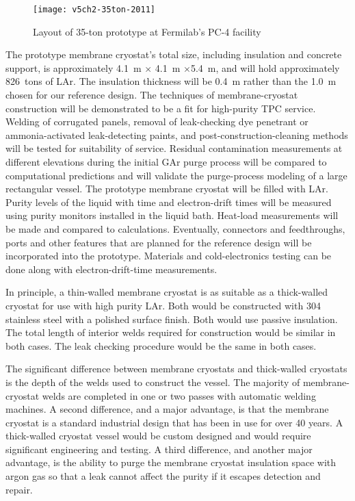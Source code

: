 \begin{figure}[htbp]
\centering
\texttt{[image: v5ch2-35ton-2011]} 
\caption{Layout of 35-ton prototype at Fermilab's PC-4 facility}
\label{fig:v5ch2-35ton-2011}
\end{figure}

The prototype membrane cryostat's total size, including insulation and concrete support, is approximately 4.1~m $\times$ 4.1~m $\times$5.4~m, and will hold approximately 826~tons of LAr. The insulation thickness will be 0.4~m rather than the 1.0~m chosen for our reference design.  The techniques of membrane-cryostat construction will be demonstrated to be a fit for high-purity TPC service.  Welding of corrugated panels, removal of leak-checking dye penetrant or ammonia-activated leak-detecting paints, and post-construction-cleaning methods will be tested for suitability of service.  Residual contamination measurements at different elevations during the initial GAr purge process will be compared to computational predictions and will validate the purge-process modeling of a large rectangular vessel.  The prototype membrane cryostat will be filled with LAr.  Purity levels of the liquid with time and electron-drift times will be measured using purity monitors installed in the liquid bath.  Heat-load measurements will be made and compared to calculations. Eventually, connectors and feedthroughs, ports and other features that are planned for the reference design will be incorporated into the prototype.  Materials and cold-electronics testing can be done along with electron-drift-time measurements.

In principle, a thin-walled membrane cryostat is as suitable as a thick-walled cryostat for use with high purity LAr. Both would be constructed with 304 stainless steel with a polished surface finish. Both would use passive insulation. The total length of interior welds required for construction would be similar in both cases. The leak checking procedure would be the same in both cases.

The significant difference between membrane cryostats and thick-walled cryostats is the depth of the welds used to construct the vessel.  The majority of membrane-cryostat welds are completed in one or two passes with automatic welding machines. A second difference, and a major advantage, is that the membrane cryostat is a standard industrial design that has been in use for over 40 years. A thick-walled cryostat vessel would be custom designed and would require significant engineering and testing. A third difference, and another major advantage, is the ability to purge the membrane cryostat insulation space with argon gas so that a leak cannot affect the purity if it escapes detection and repair. 

